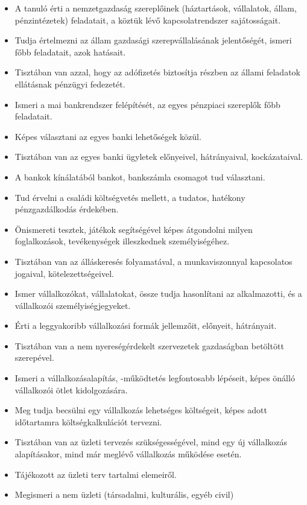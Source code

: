 \begin{itemize}
\item
  A tanuló érti a nemzetgazdaság szereplőinek (háztartások, vállalatok,
  állam, pénzintézetek) feladatait, a köztük lévő kapcsolatrendszer
  sajátosságait.
\item
  Tudja értelmezni az állam gazdasági szerepvállalásának jelentőségét,
  ismeri főbb feladatait, azok hatásait.
\item
  Tisztában van azzal, hogy az adófizetés biztosítja részben az állami
  feladatok ellátásnak pénzügyi fedezetét.
\item
  Ismeri a mai bankrendszer felépítését, az egyes pénzpiaci szereplők
  főbb feladatait.
\item
  Képes választani az egyes banki lehetőségek közül.
\item
  Tisztában van az egyes banki ügyletek előnyeivel, hátrányaival,
  kockázataival.
\item
  A bankok kínálatából bankot, bankszámla csomagot tud választani.
\item
  Tud érvelni a családi költségvetés mellett, a tudatos, hatékony
  pénzgazdálkodás érdekében.
\item
  Önismereti tesztek, játékok segítségével képes átgondolni milyen
  foglalkozások, tevékenységek illeszkednek személyiségéhez.
\item
  Tisztában van az álláskeresés folyamatával, a munkaviszonnyal
  kapcsolatos jogaival, kötelezettségeivel.
\item
  Ismer vállalkozókat, vállalatokat, össze tudja hasonlítani az
  alkalmazotti, és a vállalkozói személyiségjegyeket.
\item
  Érti a leggyakoribb vállalkozási formák jellemzőit, előnyeit,
  hátrányait.
\item
  Tisztában van a nem nyereségérdekelt szervezetek gazdaságban betöltött
  szerepével.
\item
  Ismeri a vállalkozásalapítás, -működtetés legfontosabb lépéseit, képes
  önálló vállalkozói ötlet kidolgozására.
\item
  Meg tudja becsülni egy vállalkozás lehetséges költségeit, képes adott
  időtartamra költségkalkulációt tervezni.
\item
  Tisztában van az üzleti tervezés szükségességével, mind egy új
  vállalkozás alapításakor, mind már meglévő vállalkozás működése
  esetén.
\item
  Tájékozott az üzleti terv tartalmi elemeiről.
\item
  Megismeri a nem üzleti (társadalmi, kulturális, egyéb civil)

\end{itemize}
